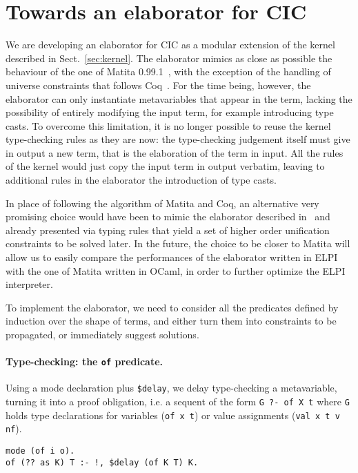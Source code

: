 \documentclass{easychair}
\begin{document}

\section{Towards an elaborator for CIC}\label{sec:cicelaborator}
We are developing an elaborator for CIC as a modular extension of the kernel described in Sect.~\ref{sec:kernel}. The elaborator mimics as close as possible the behaviour of the one of Matita 0.99.1~\cite{bidir}, with the exception of the handling of universe constraints that follows Coq~\cite{algebraic}. For the time being, however, the elaborator can only instantiate metavariables that appear in the term, lacking the possibility of entirely modifying the input term, for example introducing type casts. To overcome this limitation, it is no longer possible to reuse the kernel type-checking rules as they are now: the type-checking judgement itself must give in output a new term, that is the elaboration of the term in input. All the rules of the kernel would just copy the input term in output verbatim, leaving to additional rules in the elaborator the introduction of type casts.

In place of following the algorithm of Matita and Coq, an alternative very promising choice would have been to mimic the elaborator described in~\cite{abel} and already presented via typing rules that yield a set of higher order unification constraints to be solved later. In the future, the choice to be closer to Matita will allow us to easily compare the performances of the elaborator written in ELPI with the one of Matita written in OCaml, in order to further optimize the ELPI interpreter.

To implement the elaborator, we need to consider all the predicates defined by induction over the shape of terms, and either turn them into constraints to be propagated, or immediately suggest solutions.

\paragraph{Type-checking: the \texttt{of} predicate.}
Using a mode declaration plus \verb+$delay+, we delay type-checking a
metavariable, turning it into a proof obligation, i.e. a sequent of the form
\verb+G ?- of X t+
where \verb+G+ holds type declarations for variables (\verb+of x t+) or value assignments (\verb+val x t v nf+).

\begin{Verbatim}
mode (of i o).
of (?? as K) T :- !, $delay (of K T) K.
\end{Verbatim}
\end{document}
